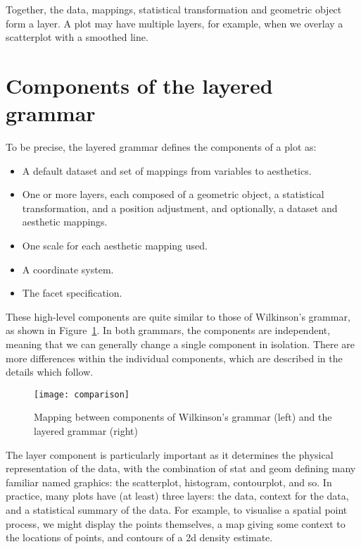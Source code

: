 \noindent Together, the data, mappings, statistical transformation and geometric object form a layer.  A plot may have multiple layers, for example, when we overlay a scatterplot with a smoothed line.

\section{Components of the layered grammar}

To be precise, the layered grammar defines the components of a plot as:

\begin{itemize}
  \item A default dataset and set of mappings from variables to aesthetics.
  \item One or more layers, each composed of a geometric object, a statistical transformation, and a position adjustment, and optionally, a dataset and aesthetic mappings.
  \item One scale for each aesthetic mapping used.
  \item A coordinate system.
  \item The facet specification.
\end{itemize}

These high-level components are quite similar to those of Wilkinson's grammar, as shown in Figure~\ref{fig:comparison}.  In both grammars, the components are independent, meaning that we can generally change a single component in isolation.  There are more differences within the individual components, which are described in the details which follow.  

\begin{figure}[htbp]
  \centering
  \texttt{[image: comparison]}
  \caption{Mapping between components of Wilkinson's grammar (left) and the layered grammar (right)}
  \label{fig:comparison}
\end{figure}

The layer component is particularly important as it determines the physical representation of the data, with the combination of stat and geom defining many familiar named graphics: the scatterplot, histogram, contourplot, and so.  In practice, many plots have (at least) three layers: the data, context for the data, and a statistical summary of the data.  For example, to visualise a  spatial point process, we might display the points themselves, a map giving some context to the locations of points, and contours of a 2d density estimate.

